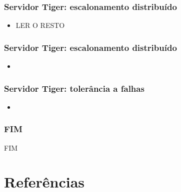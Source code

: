\documentclass[]{beamer}
\begin{document}
\begin{frame}
 \frametitle{Servidor Tiger: escalonamento distribuído}
 \begin{itemize}
       \item LER O RESTO
 \end{itemize}
\end{frame}

\begin{frame}
 \frametitle{Servidor Tiger: escalonamento distribuído}
 \begin{itemize}
       \item
 \end{itemize}
\end{frame}

\begin{frame}
 \frametitle{Servidor Tiger: tolerância a falhas}
 \begin{itemize}
       \item 
 \end{itemize}
\end{frame}






\begin{frame}
 \frametitle{FIM}
   FIM%
\end{frame}

\section{Referências}

%

\end{document}
